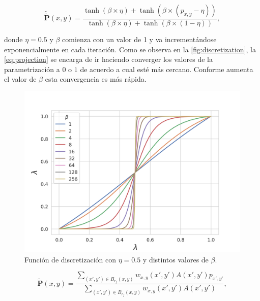 \begin{equation}
  \widetilde{\widetilde{\boldsymbol{P}}}(x, y) = \frac{\tanh (\beta \times \eta) + \tanh (\beta \times (p_{x, y}
  - \eta))}{\tanh (\beta \times \eta) + \tanh (\beta \times (1 - \eta))},
  \label{eq:projection}
\end{equation}

    donde $\eta = 0.5$ y $\beta$ comienza con un valor de 1 y va incrementándose exponencialmente en cada iteración. 
    Como se observa en la \autoref{fig:discretization}, la \autoref{eq:projection} se encarga de ir haciendo converger los valores de la parametrización a $0$ o $1$ de acuerdo a cual esté más cercano. 
    Conforme aumenta el valor de $\beta$ esta convergencia es más rápida.

    \begin{figure}[ht]
      \centering
      \includegraphics[scale=0.8]{image/theory/discretization.png}
      \caption{Función de discretización con $\eta = 0.5$ y distintos valores
      de $\beta$.}
      \label{fig:discretization}
    \end{figure}


\begin{equation}
  \widetilde{\boldsymbol{P}}(x, y) = \frac{\displaystyle\sum_{(x', y') \in B_{r_f}(x, y)} w_{x, y}(x', y')
  A(x', y')p_{x', y'}}
  {\displaystyle\sum_{(x', y') \in B_{r_f}(x, y)} w_{x, y}(x', y') A(x', y')},
  \label{eq:densityfilter}
\end{equation}

